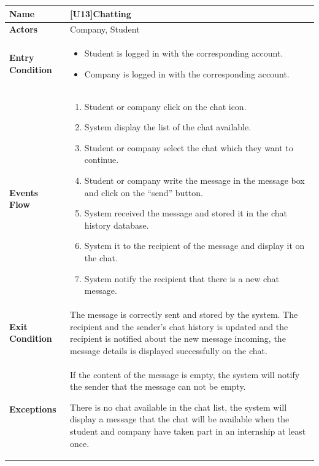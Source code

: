 \begin{center}
    \begin{tabular}{|p{9em}|p{27em}|}
        \hline
        \rowcolor{bluepoli!40} %
        \textbf{Name} & \textbf{[U13]Chatting} \\
        \hline
        \textbf{Actors} & Company, Student\\
        \hline
        \textbf{Entry Condition} & 
        \begin{itemize}
            \item Student is logged in with the corresponding account.
            \item Company is logged in with the corresponding account.
        \end{itemize} \\
        \hline
        \textbf{Events Flow} & 
        \begin{enumerate}
            \item Student or company click on the chat icon.
            \item System display the list of the chat available.
            \item Student or company select the chat which they want to continue.
            \item Student or company write the message in the message box and click on the ``send'' button.
            \item System received the message and stored it in the chat history database.
            \item System it to the recipient of the message and display it on the chat.
            \item System notify the recipient that there is a new chat message.
        \end{enumerate} \\
        \hline
        \textbf{Exit Condition} & 
         The message is correctly sent and stored by the system. The recipient and the sender's chat history is updated and the recipient is
         notified about the new message incoming, the message details is displayed successfully on the chat.\\
        \hline
        \textbf{Exceptions} &
         If the content of the message is empty, the system will notify the sender that the message can not be empty.

         There is no chat available in the chat list, the system will display a message that the chat will be available when the student and 
         company have taken part in an internship at least once.\\
        \hline
    \end{tabular}
\end{center}

